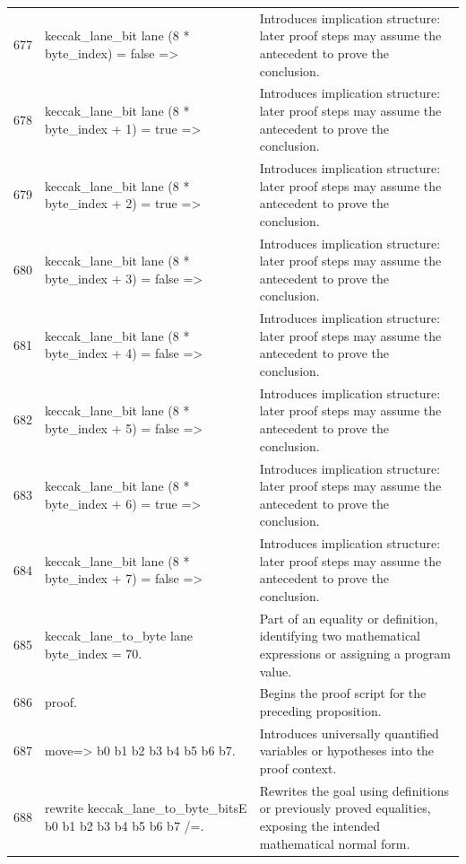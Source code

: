\documentclass[10pt]{article}
\begin{document}
\begin{longtable}{r L{0.53\textwidth} L{0.37\textwidth}}
677 & {\ttfamily\scriptsize   keccak\_lane\_bit lane (8 * byte\_index) = false =>} & Introduces implication structure: later proof steps may assume the antecedent to prove the conclusion. \\
678 & {\ttfamily\scriptsize   keccak\_lane\_bit lane (8 * byte\_index + 1) = true =>} & Introduces implication structure: later proof steps may assume the antecedent to prove the conclusion. \\
679 & {\ttfamily\scriptsize   keccak\_lane\_bit lane (8 * byte\_index + 2) = true =>} & Introduces implication structure: later proof steps may assume the antecedent to prove the conclusion. \\
680 & {\ttfamily\scriptsize   keccak\_lane\_bit lane (8 * byte\_index + 3) = false =>} & Introduces implication structure: later proof steps may assume the antecedent to prove the conclusion. \\
681 & {\ttfamily\scriptsize   keccak\_lane\_bit lane (8 * byte\_index + 4) = false =>} & Introduces implication structure: later proof steps may assume the antecedent to prove the conclusion. \\
682 & {\ttfamily\scriptsize   keccak\_lane\_bit lane (8 * byte\_index + 5) = false =>} & Introduces implication structure: later proof steps may assume the antecedent to prove the conclusion. \\
683 & {\ttfamily\scriptsize   keccak\_lane\_bit lane (8 * byte\_index + 6) = true =>} & Introduces implication structure: later proof steps may assume the antecedent to prove the conclusion. \\
684 & {\ttfamily\scriptsize   keccak\_lane\_bit lane (8 * byte\_index + 7) = false =>} & Introduces implication structure: later proof steps may assume the antecedent to prove the conclusion. \\
685 & {\ttfamily\scriptsize   keccak\_lane\_to\_byte lane byte\_index = 70.} & Part of an equality or definition, identifying two mathematical expressions or assigning a program value. \\
686 & {\ttfamily\scriptsize proof.} & Begins the proof script for the preceding proposition. \\
687 & {\ttfamily\scriptsize move=> b0 b1 b2 b3 b4 b5 b6 b7.} & Introduces universally quantified variables or hypotheses into the proof context. \\
688 & {\ttfamily\scriptsize rewrite keccak\_lane\_to\_byte\_bitsE b0 b1 b2 b3 b4 b5 b6 b7 /=.} & Rewrites the goal using definitions or previously proved equalities, exposing the intended mathematical normal form. \\

\end{longtable}
\end{document}
